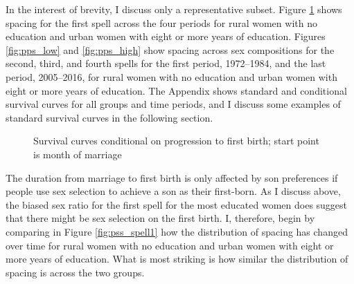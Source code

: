 \documentclass[12pt,letterpaper]{article}
\begin{document}
In the interest of brevity, I discuss only a representative subset.
Figure \ref{fig:pps_spell1} shows spacing for the first spell across the
four periods for rural women with no education and urban women with 
eight or more years of education.
Figures \ref{fig:pps_low} and \ref{fig:pps_high} show spacing across sex
compositions for the second, third, and fourth spells for the first period, 
1972--1984, and the last period, 2005--2016, for rural women with no 
education and urban women with eight or more years of education.
The Appendix shows standard and conditional survival curves for all groups and 
time periods, and I discuss some examples of standard survival
curves in the following section.


\begin{figure}[htpb]
\centering
\setcounter{subfigure}{-1}
\setcounter{subfigure}{0}
\caption{
Survival curves conditional on progression to first birth; start point is month of marriage
}
\label{fig:pps_spell1}
\end{figure}

The duration from marriage to first birth is only affected by son preferences if
people use sex selection to achieve a son as their first-born.
As I discuss above, the biased sex ratio for the first spell for the most educated 
women does suggest that there might be sex selection on the first birth.
I, therefore, begin by comparing in Figure \ref{fig:pss_spell1} how the distribution 
of spacing has changed over time for rural women with no education and urban women 
with eight or more years of education.
What is most striking is how similar the distribution of spacing is across the
two groups.
\end{document}
